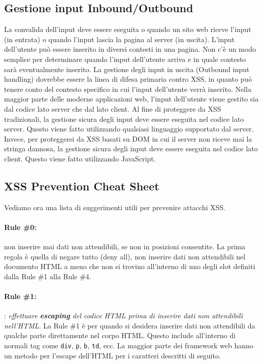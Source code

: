 \subsection{Gestione input Inbound/Outbound}

La convalida dell'input deve essere eseguita o quando un sito web riceve l'input
(in entrata)
o quando l'input lascia la pagina al server (in uscita).
L'input dell'utente può essere inserito in diversi contesti in una pagina.
Non c'è un modo
semplice per determinare quando l'input dell'utente arriva e in quale contesto sarà
eventualmente inserito. La gestione degli input in uscita (Outbound input handling)
dovrebbe
essere la linea di difesa primaria contro XSS, in quanto può tenere conto del
contesto
specifico in cui l'input dell'utente verrà inserito.
Nella maggior parte delle moderne applicazioni web, l'input dell'utente viene
gestito sia dal
codice lato server che dal lato client.
Al fine di proteggere da XSS tradizionali, la gestione sicura degli input deve
essere
eseguita nel codice lato server. Questo viene fatto utilizzando qualsiasi linguaggio
supportato dal server. Invece, per proteggersi da XSS basati su DOM in cui il
server non riceve mai la stringa
dannosa, la gestione sicura degli input deve essere eseguita nel codice lato client.
Questo viene fatto utilizzando JavaScript.

\newpage

\subsection{XSS Prevention Cheat Sheet}

Vediamo ora una lista di suggerimenti utili per prevenire attacchi XSS.

\paragraph{Rule \#0:} non inserire mai dati non attendibili, se non in posizioni
consentite.
La prima regola è quella di negare tutto (deny all), non inserire dati non
attendibili nel documento HTML a meno che non si trovino all'interno di uno degli
slot definiti dalla Rule \#1 alla Rule \#4.

\paragraph{Rule \#1:} : \textit{effettuare \textbf{escaping} del codice HTML
      prima di inserire dati non attendibili nell'HTML}.
La Rule \#1 è per quando si desidera inserire dati non attendibili da qualche
parte
direttamente nel corpo HTML. Questo include all'interno di normali tag come
\verb|div|, \verb|p|, \verb|b|, \verb|td|,
ecc. La maggior parte dei framework web hanno un metodo per l'escape dell'HTML
per i caratteri descritti di seguito.

